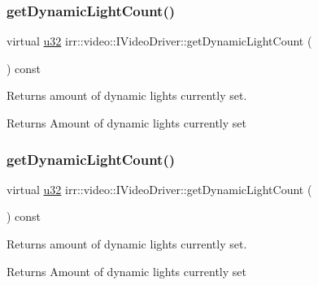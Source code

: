 \subsubsection{\texorpdfstring{get\+Dynamic\+Light\+Count()}{getDynamicLightCount()}\hspace{0.1cm}{\footnotesize\ttfamily [1/2]}}
{\footnotesize\ttfamily virtual \hyperlink{namespaceirr_a0416a53257075833e7002efd0a18e804}{u32} irr\+::video\+::\+I\+Video\+Driver\+::get\+Dynamic\+Light\+Count (\begin{DoxyParamCaption}{ }\end{DoxyParamCaption}) const\hspace{0.3cm}{\ttfamily [pure virtual]}}



Returns amount of dynamic lights currently set. 

\begin{DoxyReturn}{Returns}
Amount of dynamic lights currently set 
\end{DoxyReturn}
\mbox{\label{classirr_1_1video_1_1IVideoDriver_a9b1e5de698f264a9f74a17bdba313138}} 
\subsubsection{\texorpdfstring{get\+Dynamic\+Light\+Count()}{getDynamicLightCount()}\hspace{0.1cm}{\footnotesize\ttfamily [2/2]}}
{\footnotesize\ttfamily virtual \hyperlink{namespaceirr_a0416a53257075833e7002efd0a18e804}{u32} irr\+::video\+::\+I\+Video\+Driver\+::get\+Dynamic\+Light\+Count (\begin{DoxyParamCaption}{ }\end{DoxyParamCaption}) const\hspace{0.3cm}{\ttfamily [pure virtual]}}



Returns amount of dynamic lights currently set. 

\begin{DoxyReturn}{Returns}
Amount of dynamic lights currently set 
\end{DoxyReturn}
\mbox{\label{classirr_1_1video_1_1IVideoDriver_a4f3535b2125e654e2e9645745e50cc49}} 
